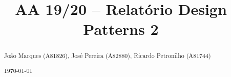 \documentclass[acmsmall,nonacm,screen]{acmart}
\begin{document}
\title{AA 19/20 -- Relatório Design Patterns 2}
\makeatletter \renewcommand{\shortauthors}{\@title} \makeatother

\begin{abstract}
\large
\vspace*{-.8\baselineskip}
João Marques (A81826), José Pereira (A82880), Ricardo Petronilho (A81744)
\vspace*{.4\baselineskip}
\par \noindent \today
\vspace*{.25\baselineskip}
\end{abstract}

\maketitle




\newpage

\end{document}
